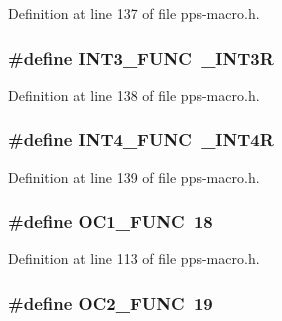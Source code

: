 Definition at line 137 of file pps-\/macro.\+h.

\hypertarget{pps-macro_8h_a37bf9fb8efd1d74a11e1090a7be58c06}{}
\subsubsection[{I\+N\+T3\+\_\+\+F\+U\+N\+C}]{\setlength{\rightskip}{0pt plus 5cm}\#define I\+N\+T3\+\_\+\+F\+U\+N\+C~\+\_\+\+I\+N\+T3\+R}\label{pps-macro_8h_a37bf9fb8efd1d74a11e1090a7be58c06}


Definition at line 138 of file pps-\/macro.\+h.

\hypertarget{pps-macro_8h_af35632208dd67995b022ea15b5fd3b95}{}
\subsubsection[{I\+N\+T4\+\_\+\+F\+U\+N\+C}]{\setlength{\rightskip}{0pt plus 5cm}\#define I\+N\+T4\+\_\+\+F\+U\+N\+C~\+\_\+\+I\+N\+T4\+R}\label{pps-macro_8h_af35632208dd67995b022ea15b5fd3b95}


Definition at line 139 of file pps-\/macro.\+h.

\hypertarget{pps-macro_8h_a28d0d3c3a473e5d87ad435c48589d1a5}{}
\subsubsection[{O\+C1\+\_\+\+F\+U\+N\+C}]{\setlength{\rightskip}{0pt plus 5cm}\#define O\+C1\+\_\+\+F\+U\+N\+C~18}\label{pps-macro_8h_a28d0d3c3a473e5d87ad435c48589d1a5}


Definition at line 113 of file pps-\/macro.\+h.

\hypertarget{pps-macro_8h_a4fc3d8333be5f0ece5cce862d07157a6}{}
\subsubsection[{O\+C2\+\_\+\+F\+U\+N\+C}]{\setlength{\rightskip}{0pt plus 5cm}\#define O\+C2\+\_\+\+F\+U\+N\+C~19}\label{pps-macro_8h_a4fc3d8333be5f0ece5cce862d07157a6}



